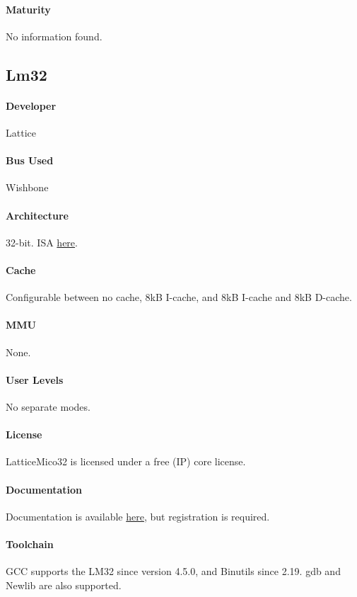 \paragraph{Maturity} No information found.

\subsection{Lm32}
\paragraph{Developer} Lattice
\paragraph{Bus Used} Wishbone
\paragraph{Architecture} 32-bit. ISA \href{http://sourceware.org/cgen/gen-doc/lm32-insn.html}{here}.
\paragraph{Cache} Configurable between no cache, 8kB I-cache, and 8kB I-cache and 8kB D-cache.
\paragraph{MMU} None.
\paragraph{User Levels} No separate modes.
\paragraph{License} LatticeMico32 is licensed under a free (IP) core license.
\paragraph{Documentation} Documentation is available \href{http://www.latticesemi.com/en/Products/DesignSoftwareAndIP/IntellectualProperty/IPCore/IPCores02/LatticeMico32.aspx#_B63AC1B3E7604B0DA4F80789A0B69A31}{here}, but registration is required.
\paragraph{Toolchain} GCC supports the LM32 since version 4.5.0, and Binutils since 2.19. gdb and Newlib are also supported.
